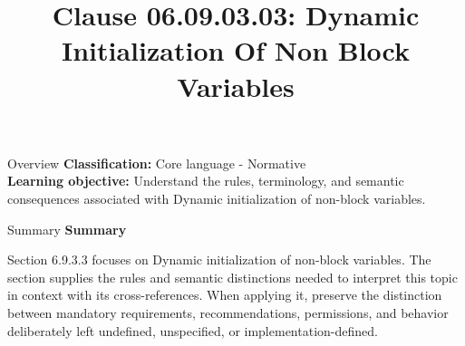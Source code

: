 \documentclass[10pt,letterpaper]{article}
\title{Clause 06.09.03.03: Dynamic Initialization Of Non Block Variables}
\author{}
\date{}
\begin{document}
\maketitle
\begin{CornellOverviewBox}{Overview}
\textbf{Classification:} Core language - Normative\\[2pt]
\textbf{Learning objective:} Understand the rules, terminology, and semantic consequences associated with Dynamic initialization of non-block variables.
\end{CornellOverviewBox}\begin{CornellSummaryBox}{Summary}
{\sffamily\bfseries\color{Accent} Summary}\par\vspace{3pt}Section 6.9.3.3 focuses on Dynamic initialization of non-block variables. The section supplies the rules and semantic distinctions needed to interpret this topic in context with its cross-references. When applying it, preserve the distinction between mandatory requirements, recommendations, permissions, and behavior deliberately left undefined, unspecified, or implementation-defined.
\end{CornellSummaryBox}
\end{document}
